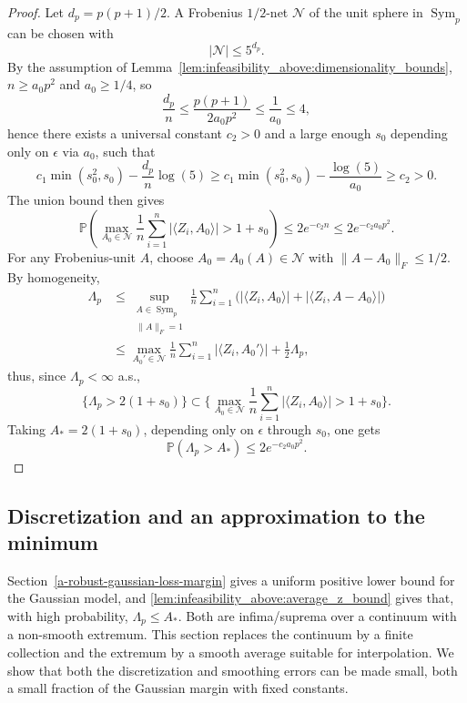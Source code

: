 \documentclass[11pt]{article}
\numberwithin{equation}{section}
\theoremstyle{definition}
\theoremstyle{remark}
\newcommand{\Pp}{\mathbb P}
\newcommand{\1}{\boldsymbol 1}
\begin{document}
\begin{aiblock}
\begin{proof}
    Let $d_p = p (p + 1) / 2$. A Frobenius $1/2$-net $\mathcal N$ of the unit sphere in $\operatorname{Sym}_p$ can be chosen with
    \[
        |\mathcal N| \le 5^{d_p}.
    \]
    By the assumption of Lemma~\ref{lem:infeasibility_above:dimensionality_bounds}, $n \ge a_0p^2$ and $a_0 \geq 1/4$, so
    \[
        \frac{d_p}{n} \le \frac{p (p + 1)}{2 a_0 p^2} \le \frac{1}{a_0} \le 4,
    \]
    hence there exists a universal constant $c_2 > 0$ and a large enough $s_0$ depending only on $\epsilon$ via $a_0$, such that
    \[
        c_1 \min(s_0^2, s_0) - \frac{d_p}{n} \log(5)
            \ge c_1 \min(s_0^2, s_0) - \frac{\log(5)}{a_0}
            \ge c_2 > 0.
    \]
    The union bound then gives
    \[
        \Pp\left(\max_{A_0 \in \mathcal N} \frac{1}{n} \sum_{i = 1}^n |\langle Z_i, A_0 \rangle| > 1 + s_0 \right)
            \le 2 e^{-c_2 n}
            \le 2 e^{-c_2 a_0 p^2}.
    \]
    For any Frobenius-unit $A$, choose $A_0 = A_0(A) \in \mathcal N$ with $\|A - A_0\|_F \le 1/2$. By homogeneity,
    \begin{align*}
        \Lambda_p
            &\le \sup_{\substack{A \in \operatorname{Sym}_p \\ \|A\|_F = 1}} \frac{1}{n} \sum_{i = 1}^n \Big(|\langle Z_i, A_0 \rangle| + |\langle Z_i, A - A_0 \rangle|\Big) \\
            &\le \max_{A_0' \in \mathcal N} \frac{1}{n} \sum_{i = 1}^n |\langle Z_i, A_0' \rangle| + \frac{1}{2} \Lambda_p,
    \end{align*}
    thus, since $\Lambda_p < \infty$ a.s.,
    \[
        \{\Lambda_p > 2(1 + s_0)\} \subset\Big\{ \max_{A_0 \in \mathcal N} \frac{1}{n} \sum_{i = 1}^n |\langle Z_i, A_0 \rangle| > 1 + s_0 \Big\}.
    \]
    Taking $A_* = 2 (1 + s_0)$, depending only on $\epsilon$ through $s_0$, one gets
    \[
        \Pp(\Lambda_p > A_*) \le 2e^{-c_2 a_0 p^2}.
    \]
\end{proof}



\subsection{Discretization and an approximation to the minimum}\label{deterministic-nets-and-free-energy-inequalities}

Section~\ref{a-robust-gaussian-loss-margin} gives a uniform positive lower bound for the Gaussian model, and \cref{lem:infeasibility_above:average_z_bound} gives that, with high probability, $\Lambda_p \le A_*$. Both are infima/suprema over a continuum with a non-smooth extremum.
This section replaces the continuum by a finite collection and the extremum by a smooth average suitable for interpolation.
We show that both the discretization and smoothing errors can be made small, both a small fraction of the Gaussian margin with fixed constants.


\end{aiblock}
\end{document}
